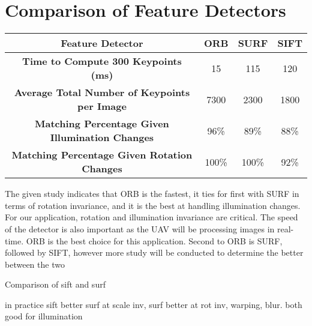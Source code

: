 \section*{Comparison of Feature Detectors} 




\begin{table}[H]
\centering
\begin{tabular}{|c|c|c|c|}
\hline
\textbf{Feature Detector} & \textbf{ORB} & \textbf{SURF} & \textbf{SIFT} \\ \hline
\textbf{Time to Compute 300 Keypoints (ms)} & 15 & 115 & 120 \\ \hline
\textbf{Average Total Number of Keypoints per Image} & 7300 & 2300 & 1800 \\ \hline
\textbf{Matching Percentage Given Illumination Changes} & 96\% & 89\% & 88\% \\ \hline
\textbf{Matching Percentage Given Rotation Changes} & 100\% & 100\% & 92\% \\ \hline
\end{tabular}
\end{table}

The given study indicates that ORB is the fastest, it ties for first with SURF in terms of rotation invariance, and it is the best at handling illumination changes. For our application, rotation and illumination invariance are critical. The speed of the detector is also important as the UAV will be processing images in real-time. ORB is the best choice for this application. Second to ORB is SURF, followed by SIFT, however more study will be conducted to determine the better between the two



Comparison of sift and surf







in practice sift better surf at scale inv, surf better at rot inv, warping, blur. both good for illumination


